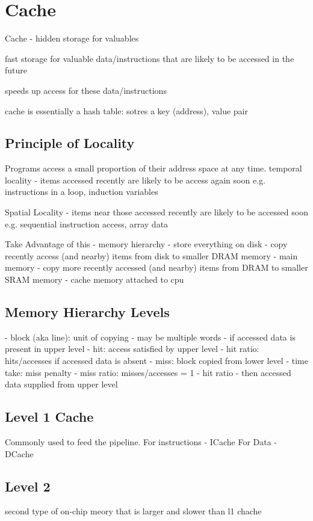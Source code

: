 \section{Cache}

Cache - hidden storage for valuables

fast storage for valuable data/instructions that are likely to be accessed
in the future

speeds up access for these data/instructions

cache is essentially a hash table: sotres a key (address), value pair

\subsection{Principle of Locality}
Programs access a small proportion of their address space at any time.
temporal locality
- items accessed recently are likely to be access again soon
e.g. instructions in a loop, induction variables

Spatial Locality
- items near those accessed recently are likely to be accessed soon
e.g. sequential instruction access, array data

Take Advantage of this
- memory hierarchy
- store everything on disk
- copy recently access (and nearby) items
  from disk to smaller DRAM memory
  - main memory
- copy more recently accessed (and nearby) items
from DRAM to smaller SRAM memory
  - cache memory attached to cpu

\subsection{Memory Hierarchy Levels}
- block (aka line): unit of copying
- may be multiple words
- if accessed data is present in upper level
  - hit: access satisfied by upper level
  - hit ratio: hits/accesses
if accessed data is absent
  - miss: block copied from lower level
    - time take: miss penalty
    - miss ratio: misses/accesses
      = 1 - hit ratio
    - then accessed data supplied from upper level

\subsection{Level 1 Cache}
Commonly used to feed the pipeline.
For instructions - ICache
For Data - DCache


\subsection{Level 2}
second type of on-chip meory that is larger and slower than l1 chache

